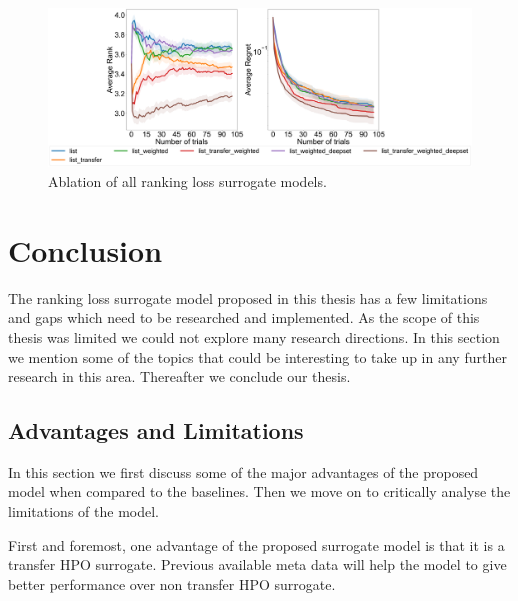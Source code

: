 \documentclass[12pt, twoside, ngerman]{report}
\begin{document}
\begin{figure}[h]
  \centering
    \includegraphics[scale=0.20]{images/FinalAblation}
    \caption{Ablation of all ranking loss surrogate models.}
    \label{fig:FinalAblation}
\end{figure}

\chapter{Conclusion}

The ranking loss surrogate model proposed in this thesis has a few limitations and gaps which need to be researched and implemented. 
As the scope of this thesis was limited we could not explore many research directions.
In this section we mention some of the topics that could be interesting to take up in any further research in this area.
Thereafter we conclude our thesis.

\section{Advantages and Limitations}
\label{sec:advantagesAndLimitations}

In this section we first discuss some of the major advantages of the proposed model when compared to the baselines.
Then we move on to critically analyse the limitations of the model.

First and foremost,  one advantage of the proposed surrogate model is that it is a transfer HPO surrogate.  Previous available meta data will help the model to give better performance over non transfer HPO surrogate.
\end{document}
